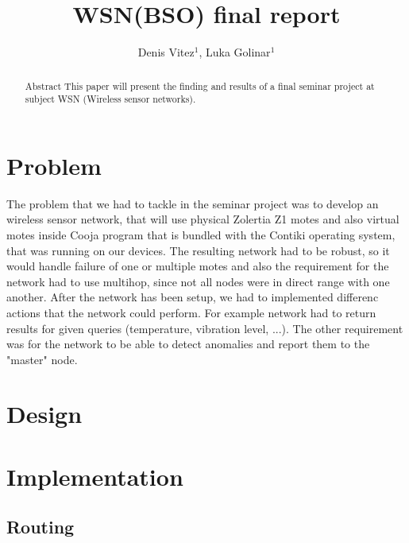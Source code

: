 \documentclass[a4paper]{article}
\begin{document}
\title{WSN(BSO) final report}

\author{Denis Vitez$^{1}$, Luka Golinar$^{1}$} %



\maketitle


\begin{abstract}{Abstract}
This paper will present the finding and results of a final seminar project at subject WSN (Wireless sensor networks).
\end{abstract}



\section{Problem}
The problem that we had to tackle in the seminar project was to develop an wireless sensor network, that will use physical Zolertia Z1 motes and also virtual motes inside Cooja program that is bundled with the Contiki operating system, that was running on our devices. The resulting network had to be robust, so it would handle failure of one or multiple motes and also the requirement for the network had to use multihop, since not all nodes were in direct range with one another. After the network has been setup, we had to implemented differenc actions that the network could perform. For example network had to return results for given queries (temperature, vibration level, ...). The other requirement was for the network to be able to detect anomalies and report them to the "master" node.
\section{Design}

\section{Implementation}
\subsection{Routing}
\end{document}
